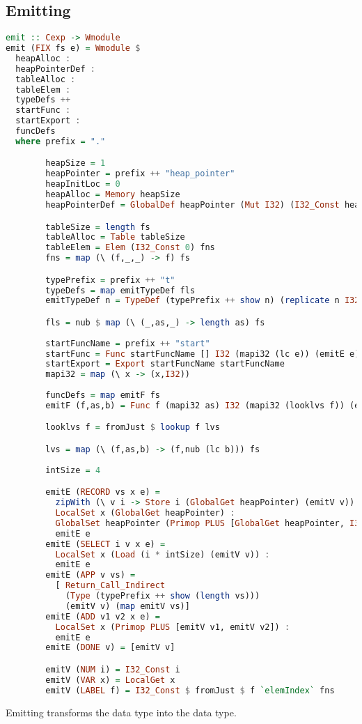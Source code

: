 \subsection{\label{section:emit}Emitting}
\begin{lstlisting}[language=Haskell]
emit :: Cexp -> Wmodule
emit (FIX fs e) = Wmodule $
  heapAlloc : 
  heapPointerDef :
  tableAlloc :
  tableElem :
  typeDefs ++
  startFunc :
  startExport :
  funcDefs
  where prefix = "."

        heapSize = 1
        heapPointer = prefix ++ "heap_pointer"
        heapInitLoc = 0
        heapAlloc = Memory heapSize
        heapPointerDef = GlobalDef heapPointer (Mut I32) (I32_Const heapInitLoc)

        tableSize = length fs
        tableAlloc = Table tableSize
        tableElem = Elem (I32_Const 0) fns
        fns = map (\ (f,_,_) -> f) fs

        typePrefix = prefix ++ "t"
        typeDefs = map emitTypeDef fls
        emitTypeDef n = TypeDef (typePrefix ++ show n) (replicate n I32) I32

        fls = nub $ map (\ (_,as,_) -> length as) fs 
        
        startFuncName = prefix ++ "start"
        startFunc = Func startFuncName [] I32 (mapi32 (lc e)) (emitE e)
        startExport = Export startFuncName startFuncName
        mapi32 = map (\ x -> (x,I32))
        
        funcDefs = map emitF fs
        emitF (f,as,b) = Func f (mapi32 as) I32 (mapi32 (looklvs f)) (emitE b)

        looklvs f = fromJust $ lookup f lvs

        lvs = map (\ (f,as,b) -> (f,nub (lc b))) fs
        
        intSize = 4

        emitE (RECORD vs x e) =
          zipWith (\ v i -> Store i (GlobalGet heapPointer) (emitV v)) vs [0,intSize..] ++
          LocalSet x (GlobalGet heapPointer) :
          GlobalSet heapPointer (Primop PLUS [GlobalGet heapPointer, I32_Const (length vs * intSize)]) :
          emitE e
        emitE (SELECT i v x e) =
          LocalSet x (Load (i * intSize) (emitV v)) :
          emitE e
        emitE (APP v vs) =
          [ Return_Call_Indirect
            (Type (typePrefix ++ show (length vs)))
            (emitV v) (map emitV vs)]
        emitE (ADD v1 v2 x e) =
          LocalSet x (Primop PLUS [emitV v1, emitV v2]) :
          emitE e
        emitE (DONE v) = [emitV v]

        emitV (NUM i) = I32_Const i
        emitV (VAR x) = LocalGet x
        emitV (LABEL f) = I32_Const $ fromJust $ f `elemIndex` fns
\end{lstlisting}

Emitting transforms the  data type into the  data type.